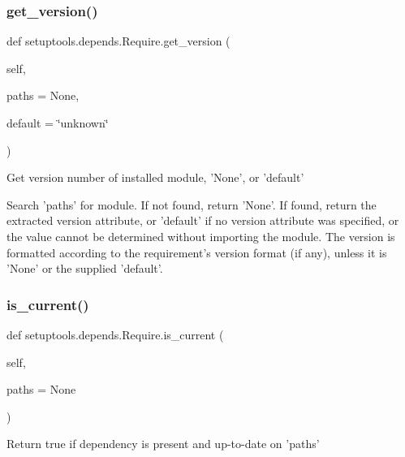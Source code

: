 \subsubsection{\texorpdfstring{get\+\_\+version()}{get\_version()}}
{\footnotesize\ttfamily def setuptools.\+depends.\+Require.\+get\+\_\+version (\begin{DoxyParamCaption}\item[{}]{self,  }\item[{}]{paths = {\ttfamily None},  }\item[{}]{default = {\ttfamily \char`\"{}unknown\char`\"{}} }\end{DoxyParamCaption})}

\begin{DoxyVerb}Get version number of installed module, 'None', or 'default'

Search 'paths' for module.  If not found, return 'None'.  If found,
return the extracted version attribute, or 'default' if no version
attribute was specified, or the value cannot be determined without
importing the module.  The version is formatted according to the
requirement's version format (if any), unless it is 'None' or the
supplied 'default'.
\end{DoxyVerb}
 \mbox{\label{classsetuptools_1_1depends_1_1Require_aca429ced44bae94f3ff8af55745d60ed}} 
\subsubsection{\texorpdfstring{is\+\_\+current()}{is\_current()}}
{\footnotesize\ttfamily def setuptools.\+depends.\+Require.\+is\+\_\+current (\begin{DoxyParamCaption}\item[{}]{self,  }\item[{}]{paths = {\ttfamily None} }\end{DoxyParamCaption})}

\begin{DoxyVerb}Return true if dependency is present and up-to-date on 'paths'\end{DoxyVerb}
 \mbox{\label{classsetuptools_1_1depends_1_1Require_a69771b02a8e6f6aee88cf1e9dfa0b6d4}} 

